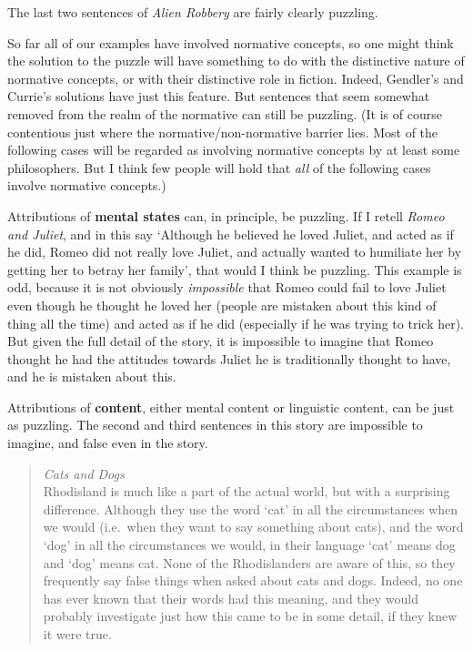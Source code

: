 \documentclass[
  10pt,
  letterpaper,
  DIV=11,
  numbers=noendperiod,
  twoside]{scrartcl}
\begin{document}
The last two sentences of \emph{Alien Robbery} are fairly clearly
puzzling.

So far all of our examples have involved normative concepts, so one
might think the solution to the puzzle will have something to do with
the distinctive nature of normative concepts, or with their distinctive
role in fiction. Indeed, Gendler's and Currie's solutions have just this
feature. But sentences that seem somewhat removed from the realm of the
normative can still be puzzling. (It is of course contentious just where
the normative/non-normative barrier lies. Most of the following cases
will be regarded as involving normative concepts by at least some
philosophers. But I think few people will hold that \emph{all} of the
following cases involve normative concepts.)

Attributions of \textbf{mental states} can, in principle, be puzzling.
If I retell \emph{Romeo and Juliet}, and in this say `Although he
believed he loved Juliet, and acted as if he did, Romeo did not really
love Juliet, and actually wanted to humiliate her by getting her to
betray her family', that would I think be puzzling. This example is odd,
because it is not obviously \emph{impossible} that Romeo could fail to
love Juliet even though he thought he loved her (people are mistaken
about this kind of thing all the time) and acted as if he did
(especially if he was trying to trick her). But given the full detail of
the story, it is impossible to imagine that Romeo thought he had the
attitudes towards Juliet he is traditionally thought to have, and he is
mistaken about this.

Attributions of \textbf{content}, either mental content or linguistic
content, can be just as puzzling. The second and third sentences in this
story are impossible to imagine, and false even in the story.

\begin{quote}
\emph{Cats and Dogs}\\
Rhodisland is much like a part of the actual world, but with a
surprising difference. Although they use the word `cat' in all the
circumstances when we would (i.e.~when they want to say something about
cats), and the word `dog' in all the circumstances we would, in their
language `cat' means dog and `dog' means cat. None of the Rhodislanders
are aware of this, so they frequently say false things when asked about
cats and dogs. Indeed, no one has ever known that their words had this
meaning, and they would probably investigate just how this came to be in
some detail, if they knew it were true.
\end{quote}
\end{document}
